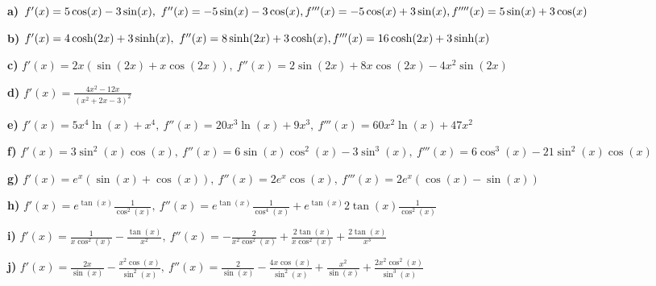 {

\textbf{a)} $f'(x)=5 \cos(x)-3\sin(x), \
f''(x) = -5 \sin(x)-3\cos(x), \\
f'''(x)= -5 \cos(x) +3\sin(x), 
f''''(x)= 5 \sin(x) +3 \cos(x)$

\textbf{b)}
$f'(x) = 4 \cosh(2x) +3\sinh(x), \
f''(x) = 8 \sinh(2x) +3 \cosh(x), \\
f'''(x) = 16 \cosh(2x)+3 \sinh(x)$

\textbf{c)}
$f'(x) = 2x( \sin(2x) +x \cos(2x)), \
f''(x)= 2 \sin(2x) +8x \cos(2x) -4x^2 \sin(2x)  $

\textbf{d)}
$f'(x)   = \frac{4x^2-12x}{(x^2+2x-3)^2}$

\textbf{e)}
$
f'(x)  = 5x^4 \ln(x) +x^4, \
f''(x) = 20 x^3 \ln(x) + 9x^3, \
f'''(x) = 60 x^2 \ln(x) +47 x^2      
$

\textbf{f)}
$
f'(x) = 3 \sin^2(x) \cos(x), \
f''(x) = 6 \sin(x) \cos^2(x) -3 \sin^3(x), \
f'''(x)   = 6 \cos^3(x) -21 \sin^2(x) \cos(x)             
$

\textbf{g)}
$
f'(x)  = e^x (\sin(x)+\cos(x)), \
f''(x) = 2 e^x \cos(x), \
f'''(x)  = 2 e^x (\cos(x)-\sin(x))             
$

\textbf{h)}
$
f'(x) =   e^{\tan(x)} \frac{1}{\cos^2(x)}, \
f''(x) = e^{\tan(x)} \frac{1}{\cos^4(x)} + e^{\tan(x)} 2 \tan(x)  \frac{1}{\cos^2(x)}
$

\textbf{i)}
$
f'(x)  = \frac{1}{x \cos^2(x)} -\frac{\tan(x)}{x^2}, \
f''(x)  =   - \frac{2}{x^2 \cos^2(x)} +\frac{2 \tan(x)}{x \cos^2(x)} + \frac{2 \tan(x)}{x^3}    
$

\textbf{j)}
$
f'(x)  = \frac{2x}{\sin(x)} - \frac{x^2 \cos(x)}{\sin^2(x)}, \
f''(x) =  \frac{2}{\sin(x)} - \frac{4x\cos(x)}{\sin^2(x)}+ \frac{x^2}{\sin(x)} + \frac{2x^2\cos^2(x)}{\sin^3(x)}
$

                                                      
}                                    
